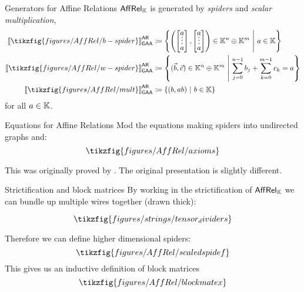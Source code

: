 \documentclass{beamer}
\begin{document}
\begin{frame}{Generators for Affine Relations}
\(\AR\) is generated by \emph{spiders} and \emph{scalar multiplication},
  \begin{align*}
    \interp{\tikzfig{figures/AffRel/b-spider}}_{\gaa}^{\abbrar}
      &\coloneqq
         \left\{
           \left(
             \begingroup
               \renewcommand*{\arraystretch}{.7}
               \begin{bmatrix}
                 a\vspace*{-.2cm}\\ \vdots \\ a
               \end{bmatrix}
               ,
               \begin{bmatrix}
                 a\vspace*{-.2cm}\\ \vdots \\ a
               \end{bmatrix}
             \endgroup
           \right) \in \K^{n}\oplus \K^m
           \ \middle|\
           a \in \K 
         \right\} \\
    \interp{ \tikzfig{figures/AffRel/w-spider}}_{\gaa}^{\abbrar}
      &\coloneqq 
        \left\{ 
          (\vec b, \vec c)
          \in \K^n \oplus \K^m
          \ \middle|\
          \sum_{j=0}^{n-1} b_j + \sum_{k=0}^{m-1}   c_k  = a 
        \right\} \\
    \interp{ \tikzfig{figures/AffRel/mult}}_{\gaa}^{\abbrar}
    &\coloneqq \left\{ \left(b,ab \right) \ \middle|\ b \in \K \right\}
  \end{align*}
  for all \(a\in\mathbb{K}\).
\end{frame}
  
 \begin{frame}{Equations for Affine Relations}
  Mod the equations making spiders into undirected graphs and:
  \[\tikzfig{figures/AffRel/axioms}\]
  
  This was originally proved by \cite{gaa}.  The original presentation is slightly different.
\end{frame}

\begin{frame}{Strictification and block matrices}
By working in the strictification of \(\AR\) we can bundle up multiple wires together (drawn thick):

 \[
    \tikzfig{figures/strings/tensor_dividers}
 \]
 
 Therefore we can define higher dimensional spiders:
  \[
    \tikzfig{figures/AffRel/scaledspidef}
  \]
  This gives us an inductive definition of block matrices
  \[
    \tikzfig{figures/AffRel/blockmatex}
  \]

\end{frame}
\end{document}
